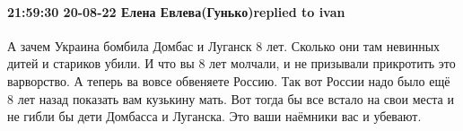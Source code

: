  
 
 
 
 

\paragraph{21:59:30 20-08-22 Елена Евлева(Гунько)replied to ivan}

А зачем Украина бомбила Домбас и Луганск 8 лет. Сколько они там невинных дитей
и стариков убили. И что вы 8 лет молчали, и не призывали прикротить это
варворство. А теперь ва вовсе обвеняете Россию. Так вот России надо было ещё 8
лет назад показать вам кузькину мать. Вот тогда бы все встало на свои места и
не гибли бы дети Домбасса и Луганска. Это ваши наёмники вас и убевают.
